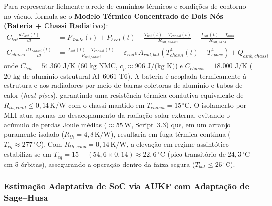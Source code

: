 Para representar fielmente a rede de caminhos térmicos e condições de contorno no vácuo, formula-se o \textbf{Modelo Térmico Concentrado de Dois Nós (Bateria + Chassi Radiativo)}:
\begin{align}
    C_{bat}\frac{dT_{bat}(t)}{dt} &= P_{Joule}(t) + P_{heat}(t) - \frac{T_{bat}(t) - T_{chassi}(t)}{R_{bat,chassi}} - \frac{T_{bat}(t) - T_{amb}}{R_{bat,MLI}} \label{eq:balanco_termico_consistente} \\
    C_{chassi}\frac{dT_{chassi}(t)}{dt} &= \frac{T_{bat}(t) - T_{chassi}(t)}{R_{bat,chassi}} - \varepsilon_{rad}\sigma A_{rad,bat}\left(T_{chassi}^4(t) - T_{space}^4\right) + \dot{Q}_{amb,chassi} \label{eq:balanco_chassi_rad}
\end{align}
onde $C_{bat} = 54.360\text{ J/K}$ ($60\text{ kg}$ NMC, $c_p \approx 906\text{ J/(kg K)}$) e $C_{chassi} = 18.000\text{ J/K}$ ($20\text{ kg}$ de alumínio estrutural Al~6061-T6). A bateria é acoplada termicamente à estrutura e aos radiadores por meio de barras coletoras de alumínio e tubos de calor (\textit{heat pipes}), garantindo uma resistência térmica condutiva equivalente de $R_{th,cond} \le 0{,}14\,\mathrm{K/W}$ com o chassi mantido em $T_{chassi} = 15\,^\circ\mathrm{C}$. O isolamento por MLI atua apenas no desacoplamento da radiação solar externa, evitando o acúmulo de perdas Joule médias ($\approx 55\,\mathrm{W}$, Script~3.3) que, em um arranjo puramente isolado ($R_{th} = 4{,}8\,\mathrm{K/W}$), resultaria em fuga térmica contínua ($T_{eq} \approx 277\,^\circ\mathrm{C}$). Com $R_{th,cond} = 0{,}14\,\mathrm{K/W}$, a elevação em regime assintótico estabiliza-se em $T_{eq} = 15 + (54{,}6 \times 0{,}14) \approx 22{,}6\,^\circ\mathrm{C}$ (pico transitório de $24{,}3\,^\circ\mathrm{C}$ em 5 órbitas), assegurando a operação dentro da faixa segura ($T_{bat} \le 25\,^\circ\mathrm{C}$).

\subsubsection{Estimação Adaptativa de SoC via AUKF com Adaptação de Sage--Husa}

